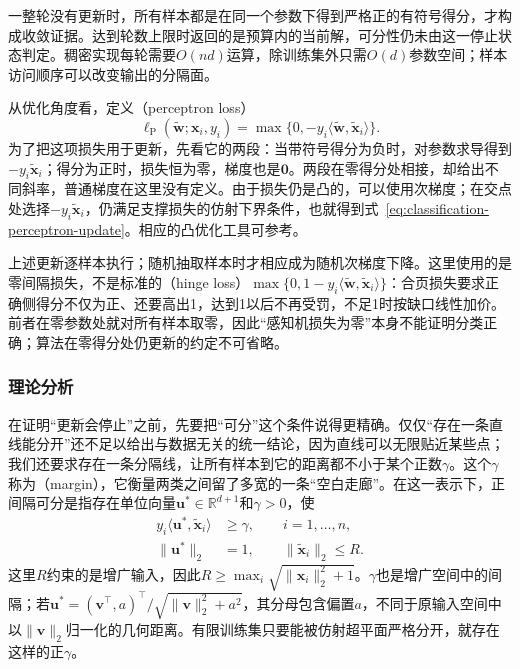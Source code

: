 一整轮没有更新时，所有样本都是在同一个参数下得到严格正的有符号得分，才构成收敛证据。达到轮数上限时返回的是预算内的当前解，可分性仍未由这一停止状态判定。稠密实现每轮需要$O(nd)$运算，除训练集外只需$O(d)$参数空间；样本访问顺序可以改变输出的分隔面。

从优化角度看，定义（perceptron loss）
\begin{equation}
  \label{eq:classification-perceptron-loss}
  \ell_{\mathrm{P}}(\tilde{\bm{w}};\bm{x}_i,y_i)
    =\max\{0,-y_i\langle\tilde{\bm{w}},\tilde{\bm{x}}_i\rangle\}.
\end{equation}
为了把这项损失用于更新，先看它的两段：当带符号得分为负时，对参数求导得到$-y_i\tilde{\bm{x}}_i$；得分为正时，损失恒为零，梯度也是$\bm 0$。两段在零得分处相接，却给出不同斜率，普通梯度在这里没有定义。由于损失仍是凸的，可以使用次梯度；在交点处选择$-y_i\tilde{\bm{x}}_i$，仍满足支撑损失的仿射下界条件，也就得到式~\eqref{eq:classification-perceptron-update}。相应的凸优化工具可参考。

上述更新逐样本执行；随机抽取样本时才相应成为随机次梯度下降。这里使用的是零间隔损失，不是标准的（hinge loss）$\max\{0,1-y_i\langle\tilde{\bm{w}},\tilde{\bm{x}}_i\rangle\}$：合页损失要求正确侧得分不仅为正、还要高出1，达到1以后不再受罚，不足1时按缺口线性加价。前者在零参数处就对所有样本取零，因此“感知机损失为零”本身不能证明分类正确；算法在零得分处仍更新的约定不可省略。

\subsubsection{理论分析}
\label{sec:classification-perceptron-analysis}

在证明“更新会停止”之前，先要把“可分”这个条件说得更精确。仅仅“存在一条直线能分开”还不足以给出与数据无关的统一结论，因为直线可以无限贴近某些点；我们还要求存在一条分隔线，让所有样本到它的距离都不小于某个正数$\gamma$。这个$\gamma$称为（margin），它衡量两类之间留了多宽的一条“空白走廊”。在这一表示下，正间隔可分是指存在单位向量$\bm{u}^\ast\in\mathbb{R}^{d+1}$和$\gamma>0$，使
\begin{equation}
  \label{eq:classification-perceptron-margin}
  \begin{aligned}
    y_i\langle\bm{u}^\ast,\tilde{\bm{x}}_i\rangle
      &\geq\gamma,\qquad i=1,\ldots,n,\\
    \|\bm{u}^\ast\|_2&=1,\qquad
    \|\tilde{\bm{x}}_i\|_2\leq R .
  \end{aligned}
\end{equation}
这里$R$约束的是增广输入，因此$R\geq\max_i\sqrt{\|\bm{x}_i\|_2^2+1}$。$\gamma$也是增广空间中的间隔；若$\bm{u}^\ast=(\bm{v}^{\top},a)^{\top}/\sqrt{\|\bm{v}\|_2^2+a^2}$，其分母包含偏置$a$，不同于原输入空间中以$\|\bm{v}\|_2$归一化的几何距离。有限训练集只要能被仿射超平面严格分开，就存在这样的正$\gamma$。

